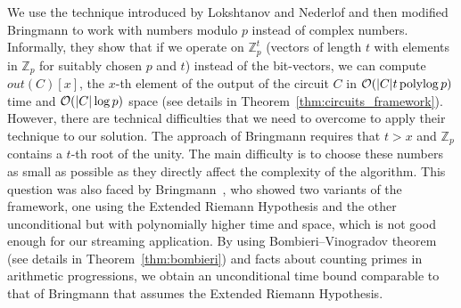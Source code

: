 We use the technique introduced by Lokshtanov and Nederlof \cite{LokshtanovN10} and then modified
Bringmann \cite{Bringmann17} to work with numbers modulo $p$ instead of complex numbers.
Informally, they show that if we operate on $\mathbb{Z}_p^t$ (vectors of length $t$ with elements in $\mathbb{Z}_p$ for suitably chosen $p$ and $t$) instead of the bit-vectors, we can compute $out(C)[x]$, the $x$-th element of the output of the circuit $C$ in $\mathcal{O}(|C|t\operatorname{polylog} p)$ time and $\mathcal{O}(|C|\log p)$ space (see details in Theorem~\ref{thm:circuits_framework}).
However, there are technical difficulties that we need to overcome to apply their technique to our solution. The approach of Bringmann \cite{Bringmann17} requires that $t>x$ and $\mathbb{Z}_p$ contains a $t$-th root of the unity.
The main difficulty is to choose these numbers as small as possible as they directly affect the complexity of the algorithm.
This question was also faced by Bringmann~\cite{Bringmann17}, who showed two variants of the framework, one using the Extended Riemann Hypothesis and the other unconditional but with polynomially higher time and space, which is not good enough for our streaming application. By using Bombieri--Vinogradov theorem (see details in Theorem~\ref{thm:bombieri}) and facts about counting primes in arithmetic progressions, we obtain an unconditional time bound comparable to that of Bringmann that assumes the Extended Riemann Hypothesis.

